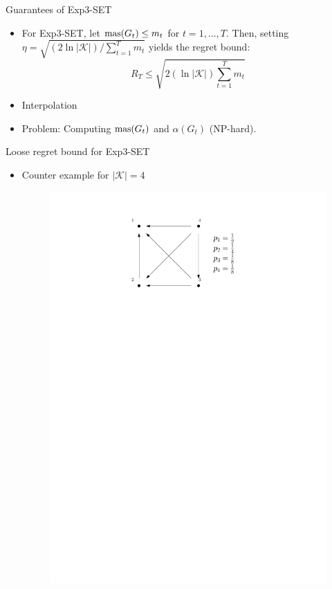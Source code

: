 \documentclass{beamer}
\newcommand{\mas}{\text{\normalfont mas}}
\begin{document}
\begin{frame}{Guarantees of Exp3-SET}
   \begin{itemize}
   \item For Exp3-SET, let $\mas(G_t)\leq m_t$ for $t=1,...,T$. Then, setting $\eta=\sqrt{(2\ln |\mathcal{K}|)/\sum_{t=1}^T m_t}$ yields the regret bound: $$R_T\leq \sqrt{2(\ln |\mathcal{K}|)\sum_{t=1}^Tm_t}$$

   \item Interpolation

   \item Problem: Computing $\mas(G_t)$ and $\alpha(G_t)$ (NP-hard). 
 \end{itemize}
\end{frame}

\begin{frame}{Loose regret bound for Exp3-SET}
  \begin{itemize}
   \item Counter example for $|\mathcal{K}|=4$


   \begin{figure}
    \centering
    \includegraphics[scale=0.7]{dag}
   \end{figure}



\end{itemize}
\end{frame}
\end{document}
